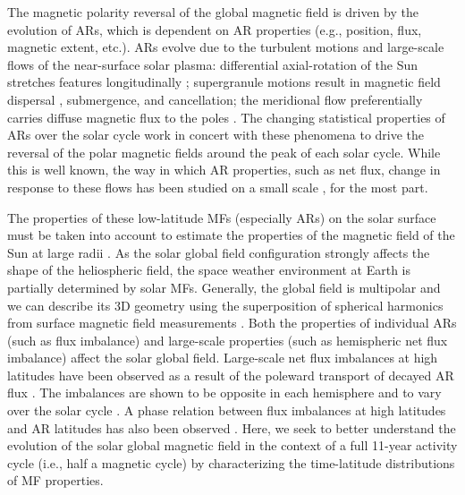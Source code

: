 \documentclass[namedreferences]{solarphysics}
\begin{document}
\begin{article}
The magnetic polarity reversal of the global magnetic field is driven by the evolution of ARs, which is dependent on AR properties (e.g., position, flux, magnetic extent, etc.).
ARs evolve due to the turbulent motions and large-scale flows of the near-surface solar plasma: differential axial-rotation of the Sun stretches features longitudinally \citep{Babcock:1961}; supergranule motions result in magnetic field dispersal \citep{Leighton:1964}, submergence, and cancellation; the meridional flow preferentially carries diffuse magnetic flux to the poles \citep{Mosher:1977}. The changing statistical properties of ARs over the solar cycle work in concert with these phenomena to drive the reversal of the polar magnetic fields around the peak of each solar cycle. While this is well known, the way in which AR properties, such as net flux, change in response to these flows has been studied on a small scale \citep{Petrie:2013b}, for the most part. 

The properties of these low-latitude MFs (especially ARs) on the solar surface must be taken into account to estimate the properties of the magnetic field of the Sun at large radii \citep[e.g., the interplanetary magnetic field:][]{Schatten:1969,wang:2003a, Schrijver:2003, schussler:2006}. As the solar global field configuration strongly affects the shape of the heliospheric field, the space weather environment at Earth is partially determined by solar MFs. Generally, the global field is multipolar and we can describe its 3D geometry using the superposition of spherical harmonics from surface magnetic field measurements \citep{stenflo:1986, stenflo:1988, knaack:2005,mordvinov:2007,Mackay:2012,DeRosa:2012}. Both the properties of individual ARs (such as flux imbalance) and large-scale properties (such as hemispheric net flux imbalance) affect the solar global field. Large-scale net flux imbalances at high latitudes have been observed as a result of the poleward transport of decayed AR flux \citep{harvey:1992}. The imbalances are shown to be opposite in each hemisphere and to vary over the solar cycle \citep{Choudhary:2002}. A phase relation between flux imbalances at high latitudes and AR latitudes has also been observed \citep{zharkov:2006,Zharkov:2008}.
Here, we seek to better understand the evolution of the solar global magnetic field in the context of a full 11-year activity cycle (i.e., half a magnetic cycle) by characterizing the time-latitude distributions of MF properties.


\end{article}
\end{document}
